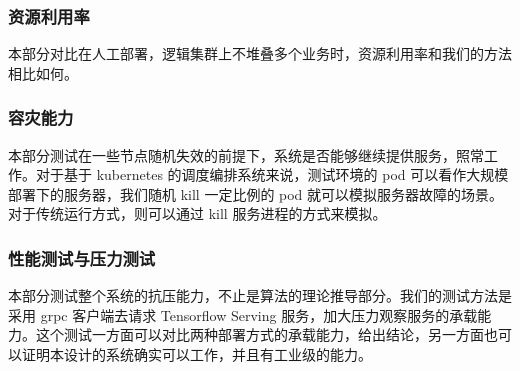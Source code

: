 \subsubsection{资源利用率}

本部分对比在人工部署，逻辑集群上不堆叠多个业务时，资源利用率和我们的方法相比如何。

\subsubsection{容灾能力}

本部分测试在一些节点随机失效的前提下，系统是否能够继续提供服务，照常工作。对于基于 kubernetes 的调度编排系统来说，测试环境的 pod 可以看作大规模部署下的服务器，我们随机 kill 一定比例的 pod 就可以模拟服务器故障的场景。对于传统运行方式，则可以通过 kill 服务进程的方式来模拟。

\subsubsection{性能测试与压力测试}

本部分测试整个系统的抗压能力，不止是算法的理论推导部分。我们的测试方法是采用 grpc 客户端去请求 Tensorflow Serving 服务，加大压力观察服务的承载能力。这个测试一方面可以对比两种部署方式的承载能力，给出结论，另一方面也可以证明本设计的系统确实可以工作，并且有工业级的能力。

